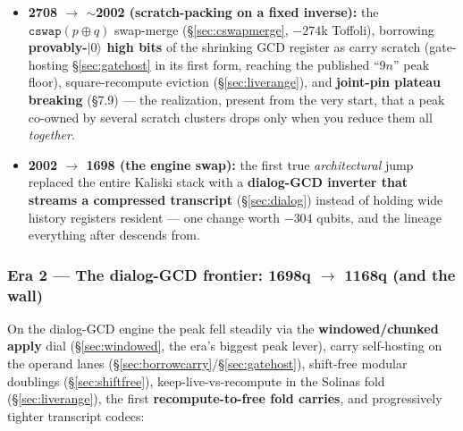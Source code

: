 \documentclass[11pt,a4paper]{article}
\newcommand{\ket}[1]{$|#1\rangle$\xspace}
\begin{document}
\begin{itemize}
  \item \textbf{2708 $\to$ $\sim$2002 (scratch-packing on a fixed inverse):} the
    $\texttt{cswap}(p\oplus q)$ swap-merge (\S\ref{sec:cswapmerge}, $-274$k Toffoli), borrowing
    \textbf{provably-\ket{0} high bits} of the shrinking GCD register as carry scratch (gate-hosting
    \S\ref{sec:gatehost} in its first form, reaching the published ``$9n$'' peak floor),
    square-recompute eviction (\S\ref{sec:liverange}), and \textbf{joint-pin plateau breaking}
    (\S7.9) --- the realization, present from the very start, that a peak co-owned by several scratch
    clusters drops only when you reduce them all \emph{together}.
  \item \textbf{2002 $\to$ 1698 (the engine swap):} the first true \emph{architectural} jump replaced
    the entire Kaliski stack with a \textbf{dialog-GCD inverter that streams a compressed transcript}
    (\S\ref{sec:dialog}) instead of holding wide history registers resident --- one change worth
    $-304$ qubits, and the lineage everything after descends from.
\end{itemize}

\subsubsection{Era 2 --- The dialog-GCD frontier: 1698q $\to$ 1168q (and the wall)}

On the dialog-GCD engine the peak fell steadily via the \textbf{windowed/chunked apply} dial
(\S\ref{sec:windowed}, the era's biggest peak lever), carry self-hosting on the operand lanes
(\S\ref{sec:borrowcarry}/\S\ref{sec:gatehost}), shift-free modular doublings (\S\ref{sec:shiftfree}),
keep-live-vs-recompute in the Solinas fold (\S\ref{sec:liverange}), the first \textbf{recompute-to-free
fold carries}, and progressively tighter transcript codecs:
\end{document}
